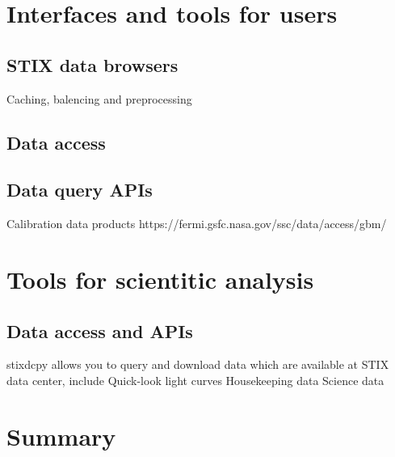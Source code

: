 \documentclass[referee]{aa} %
\begin{document}
\section{Interfaces and tools for users}
\subsection{STIX data browsers}
Caching, balencing and preprocessing
\subsection{Data access}
\subsection{Data query APIs}
Calibration data products
https://fermi.gsfc.nasa.gov/ssc/data/access/gbm/
\section{Tools for scientitic analysis }
\subsection{Data access and APIs}
stixdcpy allows you to query and download data which are available at STIX data center, include
Quick-look light curves
Housekeeping data
Science data



\section{Summary}
\label{sec:summary}



%
%



\end{document}
